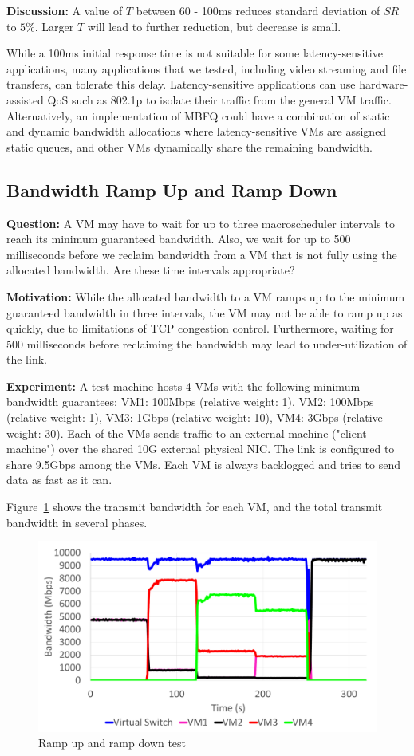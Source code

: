 {\bf Discussion:} A value of $T$ between 60 - 100ms reduces standard deviation
of $SR$ to $5\%$.  Larger $T$ will lead to further reduction, but decrease is
small.

While a 100ms initial response time is not suitable for some latency-sensitive applications,
many applications that we tested, including video streaming and file transfers, can tolerate
this delay. Latency-sensitive applications can use hardware-assisted QoS such as 802.1p
to isolate their traffic from the general VM traffic.  Alternatively, an implementation of MBFQ
could have a combination of static and dynamic bandwidth allocations where latency-sensitive
VMs are assigned static queues, and other VMs dynamically share the remaining bandwidth.

\subsection{Bandwidth Ramp Up and Ramp Down}
\label{sec:fairshare}
{\bf Question:} A VM may have to wait for up to three macroscheduler intervals to reach its
minimum guaranteed bandwidth. Also, we wait for up to 500 milliseconds before we
reclaim bandwidth from a VM that is not fully using the allocated bandwidth. Are
these time intervals appropriate?

{\bf Motivation:}  While the allocated bandwidth to a VM ramps up to the minimum
guaranteed bandwidth in three intervals, the VM may not be able to ramp up as
quickly, due to limitations of TCP congestion control. Furthermore, waiting
for 500 milliseconds before reclaiming the bandwidth may lead to
under-utilization of the link.

{\bf Experiment:}  A test machine hosts 4 VMs with the following
minimum bandwidth guarantees: VM1: 100Mbps (relative weight: 1), VM2: 100Mbps
(relative weight: 1), VM3: 1Gbps (relative weight: 10), VM4: 3Gbps (relative
weight: 30). Each of the VMs sends traffic to an external machine ("client
machine") over the shared 10G external physical NIC.  The link is configured to
share 9.5Gbps among the VMs.  Each VM is always 
backlogged and tries to send data as fast as it can.

Figure~\ref{fairsharing}  shows the transmit bandwidth for each VM, and the
total transmit bandwidth in several phases. 

\begin{figure}[h]
\centering
\includegraphics[width=0.8\columnwidth,trim=60pt 20mm 0pt 8mm]{figures/fairsharing}
\caption{Ramp up and ramp down test}
\label{fairsharing}
\vspace{-3mm}
\end{figure}

